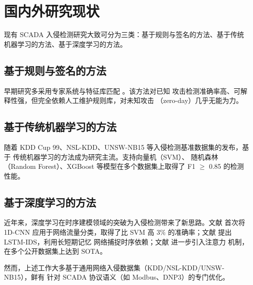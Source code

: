 \section{国内外研究现状}
\label{sec:related}

\par 现有 SCADA 入侵检测研究大致可分为三类：基于规则与签名的方法、基于传统
机器学习的方法、基于深度学习的方法。

\subsection{基于规则与签名的方法}
\label{sec:rule_based}

\par 早期研究多采用专家系统与特征库匹配 \cite{ref:snort_1999}。该方法对已知
攻击检测准确率高、可解释性强，但完全依赖人工维护规则库，对未知攻击
（zero-day）几乎无能为力。

\subsection{基于传统机器学习的方法}
\label{sec:ml_based}

\par 随着 KDD Cup 99、NSL-KDD、UNSW-NB15 等入侵检测基准数据集的发布，基于
传统机器学习的方法成为研究主流。支持向量机（SVM）\cite{ref:svm_ids_2008}、
随机森林（Random Forest）\cite{ref:rf_ids_2010}、XGBoost
\cite{ref:xgboost_ids_2019} 等模型在多个数据集上取得了 F1 $\geq$ 0.85 的检测
性能。


\subsection{基于深度学习的方法}
\label{sec:dl_based}

\par 近年来，深度学习在时序建模领域的突破为入侵检测带来了新思路。文献
\cite{ref:cnn_ids_2017} 首次将 1D-CNN 应用于网络流量分类，取得了比 SVM 高
3\% 的准确率；文献 \cite{ref:lstm_ids_2018} 提出 LSTM-IDS，利用长短期记忆
网络捕捉时序依赖；文献 \cite{ref:transformer_ids_2021} 进一步引入注意力
机制，在多个公开数据集上达到 SOTA。

然而，上述工作大多基于通用网络入侵数据集（KDD/NSL-KDD/UNSW-NB15），鲜有
针对 SCADA 协议语义（如 Modbus、DNP3）的专门优化。

